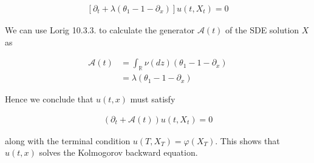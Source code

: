 \documentclass[12pt, a4paper]{article}
\begin{document}
\begin{enumerate}
\begin{enumerate}
            \begin{align}
                \left[ \partial_t + \lambda \left( \theta_1 - 1 - \partial_x  \right) \right]u(t, X_t) = 0
            \end{align}

            We can use Lorig 10.3.3. to calculate the generator $\mathcal A(t)$ of the SDE solution $X$ as 

            \begin{align*}
                \mathcal A(t) &= \int_{\mathbb R} \nu(dz) \left(\theta_1 - 1 - \partial_x \right) \\
                &= \lambda \left(\theta_1 - 1 - \partial_x \right)
            \end{align*}

            Hence we conclude that $u(t,x)$ must satisfy

            \begin{align*}
                (\partial_t + \mathcal A(t)) u(t,X_t) = 0
            \end{align*}

            along with the terminal condition $u(T, X_T)= \varphi(X_T)$. This shows that $u(t,x)$ solves the Kolmogorov backward equation. 


        \end{enumerate}

    \end{enumerate}
\end{document}
